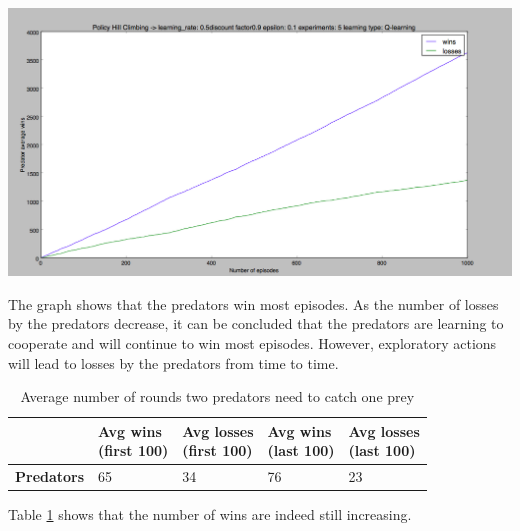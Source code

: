 \begin{center}
	\includegraphics[scale=0.3]{hillclimbing1000times5step01}
	\label{graph:phc_2v1}
\end{center}

The graph shows that the predators win most episodes. As the number of losses by the predators decrease, it can be concluded that the predators are learning to cooperate and will continue to win most episodes. However, exploratory actions will lead to losses by the predators from time to time.

\begin{table}[H]
\begin{center}
\begin{tabular}{| l | l | l | l | l |}
\hline
 & \parbox{2cm}{\textbf{Avg wins \\ (first 100)}} & \parbox{2cm}{\textbf{Avg losses \\ (first 100)}} & \parbox{2cm}{\textbf{Avg wins \\ (last 100)}} & \parbox{2cm}{\textbf{Avg losses \\ (last 100)}} \\
\hline
\textbf{Predators} & 65 & 34 & 76 & 23 \\
\hline
\end{tabular}
\caption{Average number of rounds two predators need to catch one prey}
\label{table:2vs1}
\end{center}
\end{table}

Table \ref{table:2vs1} shows that the number of wins are indeed still increasing.